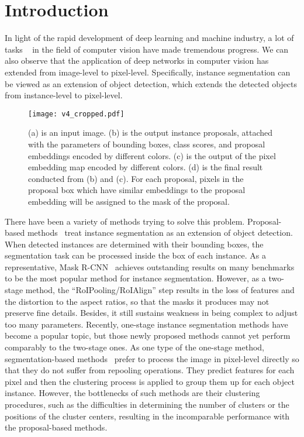 \documentclass[10pt,twocolumn,letterpaper]{article}
\begin{document}
\section{Introduction}

In light of the rapid development of deep learning and machine industry, a lot of tasks ~\cite{girshick2014rich, he2017mask, he2016deep, krizhevsky2012imagenet, liu2016ssd, redmon2016youyolo, ren2015faster,zhao2017pyramidpspnet} in the field of computer vision have made tremendous progress.
We can also observe that the application of deep networks in computer vision has extended from image-level to pixel-level. Specifically, instance segmentation can be viewed as an extension of object detection, which extends the detected objects from instance-level to pixel-level. 

\begin{figure}[t]
   \begin{center}
      \texttt{[image: v4\_cropped.pdf]}
   \end{center}
   \caption{(a) is an input image. (b) is the output instance proposals, attached with the parameters of bounding boxes, class scores, and proposal embeddings encoded by different colors. (c) is the output of the pixel embedding map encoded by different colors. (d) is the final result conducted from (b) and (c).
    For each proposal, pixels in the proposal box which have similar embeddings to the proposal embedding will be assigned to the mask of the proposal. }
   \label{fig:framework}
\end{figure}

There have been a variety of methods trying to solve this problem.
Proposal-based methods~\cite{chen2018masklab,dai2016instance_iccv,he2017mask} treat instance segmentation as an extension of object detection. When detected instances are determined with their bounding boxes, 
the segmentation task can be processed inside the box of each instance. 
As a representative, Mask R-CNN~\cite{he2017mask} achieves outstanding results on many benchmarks to be the most popular method for instance segmentation. 
However, as a two-stage method, the ``RoIPooling/RoIAlign'' step results in the loss of features and the distortion to the aspect ratios, so that the masks it produces may not preserve fine details. 
Besides, it still sustains weakness in being complex to adjust too many parameters. 
Recently, one-stage instance segmentation methods have become a popular topic, but those newly proposed methods cannot yet perform comparably to the two-stage ones. 
As one type of the one-stage method, segmentation-based methods~\cite{bai2017deep,de2017semantic,fathi2017semantic,kirillov2017instancecut,kong2018recurrent,liang2017proposal,neven2019instance} prefer to process the image in pixel-level directly so that they do not suffer from repooling operations. 
They predict features for each pixel and then the clustering process is applied to group them up for each object instance. 
However, the bottlenecks of such methods are their clustering procedures, such as the difficulties in determining the number of clusters or the positions of the cluster centers, resulting in the incomparable performance with the proposal-based methods. 
\end{document}
